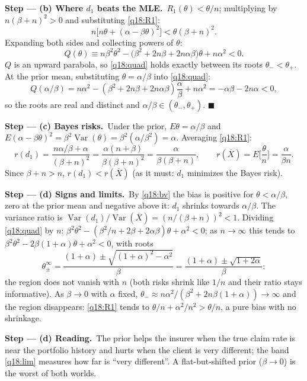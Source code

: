 \documentclass[11pt,a4paper]{article}
\numberwithin{equation}{questao}   %
\newcommand{\passo}[2]{\par\smallskip\noindent\textbf{Step --- #1.}~#2}
\newcommand{\Var}{\operatorname{Var}}
\newcommand{\1}{\mathbf{1}}
\begin{document}
\begin{sol}
\passo{(b) Where $d_1$ beats the MLE}{$R_1(\theta)<\theta/n$; multiplying by $n(\beta+n)^2>0$ and
substituting \eqref{q18:R1}:}
\[
n\big[n\theta+(\alpha-\beta\theta)^2\big]<\theta(\beta+n)^2 .
\]
Expanding both sides and collecting powers of $\theta$:
\begin{equation}\label{q18:quad}
Q(\theta)\equiv n\beta^2\theta^2-\big(\beta^2+2n\beta+2n\alpha\beta\big)\theta+n\alpha^2<0 .
\end{equation}
$Q$ is an upward parabola, so \eqref{q18:quad} holds exactly between its roots $\theta_-<\theta_+$.
At the prior mean, substituting $\theta=\alpha/\beta$ into \eqref{q18:quad}:
\[
Q(\alpha/\beta)=n\alpha^2-(\beta^2+2n\beta+2n\alpha\beta)\frac\alpha\beta+n\alpha^2=-\alpha\beta-2n\alpha<0,
\]
so the roots are real and distinct and $\alpha/\beta\in(\theta_-,\theta_+)$. $\blacksquare$

\passo{(c) Bayes risks}{Under the prior, $E\theta=\alpha/\beta$ and $E(\alpha-\beta\theta)^2=\beta^2\Var(\theta)=\beta^2(\alpha/\beta^2)=\alpha$.
Averaging \eqref{q18:R1}:}
\begin{equation}\label{q18:r1}
r(d_1)=\frac{n\alpha/\beta+\alpha}{(\beta+n)^2}=\frac{\alpha(n+\beta)}{\beta(\beta+n)^2}=\frac{\alpha}{\beta(\beta+n)},
\qquad r(\overline X)=E\Big[\frac\theta n\Big]=\frac{\alpha}{\beta n}.
\end{equation}
Since $\beta+n>n$, $r(d_1)<r(\overline X)$ (as it must: $d_1$ minimizes the Bayes risk).

\passo{(d) Signs and limits}{By \eqref{q18:bv} the bias is positive for $\theta<\alpha/\beta$, zero at
the prior mean and negative above it: $d_1$ shrinks towards $\alpha/\beta$. The variance ratio is
$\Var(d_1)/\Var(\overline X)=(n/(\beta+n))^2<1$. Dividing \eqref{q18:quad} by $n$:
$\beta^2\theta^2-(\beta^2/n+2\beta+2\alpha\beta)\theta+\alpha^2<0$; as $n\to\infty$ this tends to
$\beta^2\theta^2-2\beta(1+\alpha)\theta+\alpha^2<0$, with roots}
\begin{equation}\label{q18:lim}
\theta_\pm^\infty=\frac{(1+\alpha)\pm\sqrt{(1+\alpha)^2-\alpha^2}}{\beta}=\frac{(1+\alpha)\pm\sqrt{1+2\alpha}}{\beta}:
\end{equation}
the region does not vanish with $n$ (both risks shrink like $1/n$ and their ratio stays informative).
As $\beta\to0$ with $\alpha$ fixed, $\theta_-\approx n\alpha^2/(\beta^2+2n\beta(1+\alpha))\to\infty$
and the region disappears: \eqref{q18:R1} tends to $\theta/n+\alpha^2/n^2>\theta/n$, a pure bias with
no shrinkage.

\passo{(d) Reading}{The prior helps the insurer when the true claim rate is near the portfolio
history and hurts when the client is very different; the band \eqref{q18:lim} measures how far is
``very different''. A flat-but-shifted prior ($\beta\to0$) is the worst of both worlds.}


\end{sol}
\end{document}
